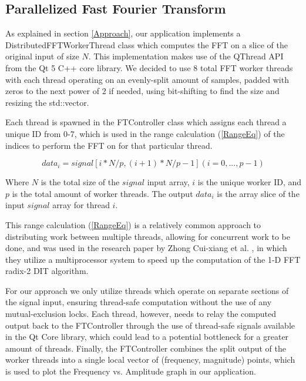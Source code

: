 \documentclass[journal]{IEEEtran}
\begin{document}
\subsection{Parallelized Fast Fourier Transform}
		\par{
			As explained in section \ref{Approach}, our application implements
			a DistributedFFTWorkerThread class which computes the FFT on a
			slice of the original input of size $N$. This implementation makes use
			of the QThread API from the Qt 5 C++ core library. We decided to use 8
			total FFT worker threads with each thread operating on an evenly-split
			amount of samples, padded with zeros to the next power of 2 if needed, using
			bit-shifting to find the size and resizing the std::vector.

			Each thread is spawned in the FTController class which assigns each thread
			a unique ID from 0-7, which is used in the range calculation
			(\ref{RangeEq}) of the indices to perform the FFT on for that particular
			thread. 
			
			\begin{equation}\label{RangeEq}
				data_i = signal[i*N/p, (i+1)*N/p - 1] (i = 0, ..., p-1)
			\end{equation}

			Where $N$ is the total size of the $signal$ input array,
			$i$ is the unique worker ID, and $p$ is the total amount of worker
			threads. The output $data_i$ is the array slice of the input $signal$ 
			array for thread $i$.

			This range calculation (\ref{RangeEq}) is a relatively common
			approach to distributing work between multiple threads, allowing for
			concurrent work to be done, and was used in the research paper by 
			Zhong Cui-xiang et al. \cite{Xiang}, in which they utilize a 
			multiprocessor system to speed up the computation of the 1-D
			FFT radix-2 DIT algorithm.

			For our approach we only utilize threads which operate on separate
			sections of the signal input, ensuring thread-safe computation
			without the use of any mutual-exclusion locks. Each thread, however,
			needs to relay the computed output back to the FTController through
			the use of thread-safe signals available in the Qt Core library, 
			which could lead to a potential bottleneck for a greater amount of
			threads. Finally, the FTController combines the split output of the worker
			threads into a single local vector of (frequency, magnitude) points, which
			is used to plot the Frequency vs. Amplitude graph in our application.
		}
\end{document}
